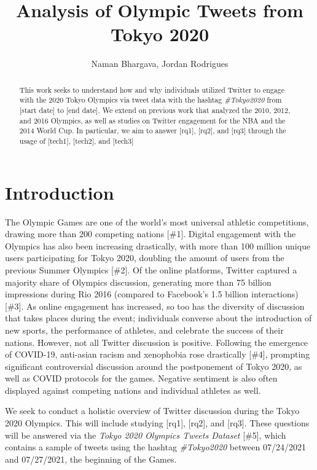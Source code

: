 \documentclass[letterpaper]{article} %
\title{Analysis of Olympic Tweets from Tokyo 2020}
\author{
    Naman Bhargava, Jordan Rodrigues\\
}
\begin{document}
\maketitle

\begin{abstract}
    This work seeks to understand how and why individuals utilized Twitter to engage with the 2020 Tokyo Olympics via tweet data with the hashtag \emph{\#Tokyo2020} from [start date] to [end date]. We  extend on previous work that analyzed the 2010, 2012, and 2016 Olympics, as well as studies on Twitter engagement for the NBA and the 2014 World Cup. In particular, we aim to answer [rq1], [rq2], and [rq3] through the usage of [tech1], [tech2], and [tech3]
\end{abstract}

\section{Introduction}

The Olympic Games are one of the world's most universal athletic competitions, drawing more than 200 competing nations [\#1]. Digital engagement with the Olympics has also been increasing drastically, with more than 100 million unique users participating for Tokyo 2020, doubling the amount of users from the previous Summer Olympics [\#2]. Of the online platforms, Twitter captured a majority share of Olympics discussion, generating more than 75 billion impressions during Rio 2016 (compared to Facebook's 1.5 billion interactions) [\#3]. As online engagement has increased, so too has the diversity of discussion that takes places during the event; individuals converse about the introduction of new sports, the performance of athletes, and celebrate the success of their nations. However, not all Twitter discussion is positive. Following the emergence of COVID-19, anti-asian racism and xenophobia rose drastically [\#4], prompting significant controversial discussion around the postponement of Tokyo 2020, as well as COVID protocols for the games. Negative sentiment is also often displayed against competing nations and individual athletes as well.

We seek to conduct a holistic overview of Twitter discussion during the Tokyo 2020 Olympics. This will include studying [rq1], [rq2], and [rq3]. These questions will be answered via the \emph{Tokyo 2020 Olympics Tweets Dataset} [\#5], which contains a sample of tweets using the hashtag \emph{\#Tokyo2020} between 07/24/2021 and 07/27/2021, the beginning of the Games.
\end{document}
